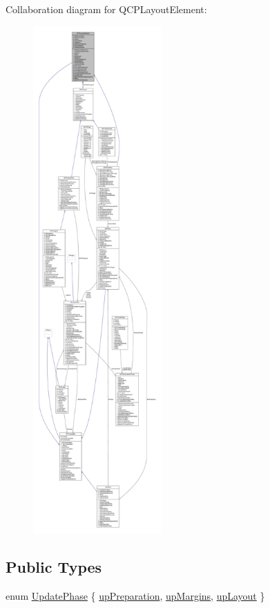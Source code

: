 Collaboration diagram for Q\+C\+P\+Layout\+Element\+:\nopagebreak
\begin{figure}[H]
\begin{center}
\leavevmode
\includegraphics[height=550pt]{class_q_c_p_layout_element__coll__graph}
\end{center}
\end{figure}
\subsection*{Public Types}
\begin{DoxyCompactItemize}
\item 
enum \hyperlink{class_q_c_p_layout_element_a0d83360e05735735aaf6d7983c56374d}{Update\+Phase} \{ \hyperlink{class_q_c_p_layout_element_a0d83360e05735735aaf6d7983c56374dad6119882eba136357c2f627992e527d3}{up\+Preparation}, 
\hyperlink{class_q_c_p_layout_element_a0d83360e05735735aaf6d7983c56374da288cb59a92280e47261a341f2813e676}{up\+Margins}, 
\hyperlink{class_q_c_p_layout_element_a0d83360e05735735aaf6d7983c56374da5d1ccf5d79967c232c3c511796860045}{up\+Layout}
 \}
\end{DoxyCompactItemize}
